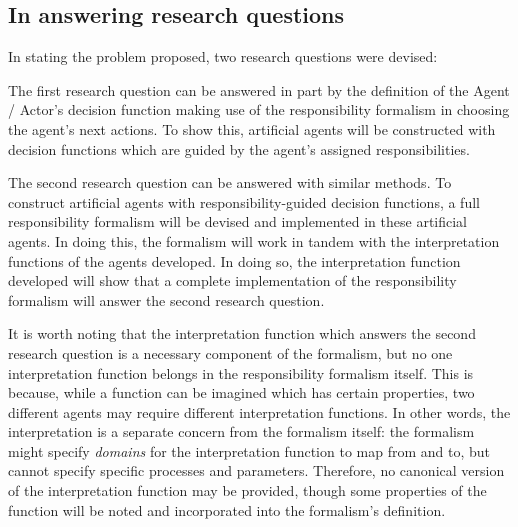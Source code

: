 \subsection{In answering research questions}
In stating the problem proposed, two research questions were devised:

The first research question can be answered in part by the definition of the Agent / Actor's decision function making use of the responsibility formalism in choosing the agent's next actions. To show this, artificial agents will be constructed with decision functions which are guided by the agent's assigned responsibilities.\par

The second research question can be answered with similar methods. To construct artificial agents with responsibility-guided decision functions, a full responsibility formalism will be devised and implemented in these artificial agents. In doing this, the formalism will work in tandem with the interpretation functions of the agents developed. In doing so, the interpretation function developed will show that a complete implementation of the responsibility formalism will answer the second research question.\par

It is worth noting that the interpretation function which answers the second research question is a necessary component of the formalism, but no one interpretation function belongs in the responsibility formalism itself. This is because, while a function can be imagined which has certain properties, two different agents may require different interpretation functions. In other words, the interpretation is a separate concern from the formalism itself: the formalism might specify \emph{domains} for the interpretation function to map from and to, but cannot specify specific processes and parameters. Therefore, no canonical version of the interpretation function may be provided, though some properties of the function will be noted and incorporated into the formalism's definition.\par
